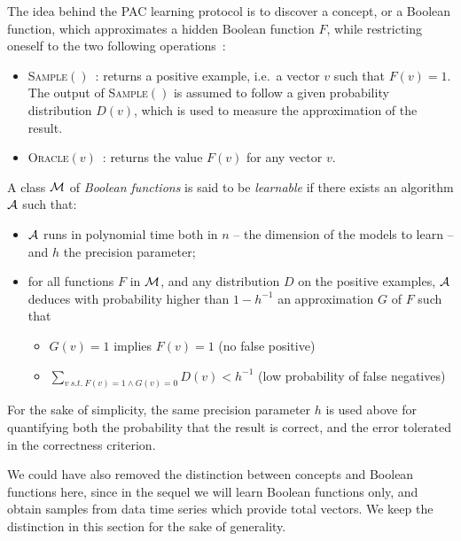 \documentclass{llncs}
\begin{document}
The idea behind the PAC learning protocol is to discover a concept, or a Boolean function, which approximates a hidden Boolean function $F$, while restricting oneself to the two following operations~:
\begin{itemize}
  \item
\textsc{Sample}$()$~: returns a positive example, i.e.~a vector $v$ such that $F(v)=1$. 
The output of \textsc{Sample}$()$ is assumed to follow a given probability distribution $D(v)$, which is used to measure the approximation of the result.
  \item
\textsc{Oracle}$(v)$~: returns the value $F(v)$ for any vector $v$.
\end{itemize}


\begin{definition}
	\label{def:learnclass}
   A class $\cal M$ of \emph{Boolean functions} is said to be \emph{learnable}
   if there exists an algorithm $\cal A$ such that:
   \begin{itemize}
      \item $\cal A$ runs in polynomial time both in $n$ -- the dimension of the models to learn -- and $h$ the precision parameter;
      \item
         for all functions $F$ in $\cal M$, and any distribution $D$ on the positive examples, %
         $\cal A$ deduces with probability higher than $1-h^{-1}$ an approximation $G$ of $F$ such that
         \begin{itemize}
            \item $G(v)=1$ implies $F(v)=1$ (no false positive)
            \item
               $\displaystyle\sum_{v\ s.t.\ F(v)=1\wedge G(v)=0} D(v) < h^{-1}$ (low probability of false negatives)
         \end{itemize}
   \end{itemize}
\end{definition}

For the sake of simplicity, the same precision parameter $h$ is used above for quantifying both the probability that the result is correct,
and the error tolerated in the correctness criterion.

We could have also removed the distinction between concepts and Boolean functions here,
since in the sequel we will learn Boolean functions only, and obtain samples from data time series which provide total vectors.
We keep the distinction in this section for the sake of generality.
\end{document}
